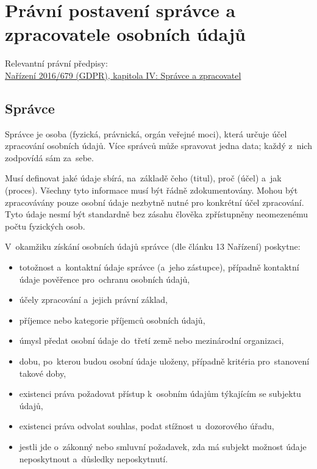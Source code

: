 \clearpage
\section{Právní postavení správce a zpracovatele osobních údajů}

{}Relevantní právní předpisy:
\\\href{https://eur-lex.europa.eu/legal-content/CS/ALL/?uri=CELEX:32016R0679#d1e3011-1-1
}{Nařízení 2016/679 (GDPR), kapitola IV: Správce a zpracovatel}

\subsection{Správce}

Správce je osoba (fyzická, právnická, orgán veřejné moci), která určuje účel zpracování osobních údajů.
Více správců může spravovat jedna data; každý z~nich zodpovídá sám za~sebe.

Musí definovat jaké údaje sbírá, na~základě čeho (titul), proč (účel) a~jak (proces).
Všechny tyto informace musí být řádně zdokumentovány.
Mohou být zpracovávány pouze osobní údaje nezbytně nutné pro konkrétní účel zpracování.
Tyto údaje nesmí být standardně bez zásahu člověka zpřístupněny neomezenému počtu fyzických osob.

V~okamžiku získání osobních údajů správce (dle článku 13 Nařízení) poskytne:

\begin{itemize}
    \item totožnost a~kontaktní údaje správce (a~jeho zástupce), případně kontaktní údaje pověřence pro~ochranu osobních údajů,
    \item účely zpracování a~jejich právní základ,
    \item příjemce nebo kategorie příjemců osobních údajů,
    \item úmysl předat osobní údaje do~třetí země nebo mezinárodní organizaci,
    \item dobu, po~kterou budou osobní údaje uloženy, případně kritéria pro~stanovení takové doby,
    \item existenci práva požadovat přístup k~osobním údajům týkajícím se subjektu údajů,
    \item existenci práva odvolat souhlas, podat stížnost u~dozorového úřadu,
    \item jestli jde o~zákonný nebo smluvní požadavek, zda má subjekt možnost údaje neposkytnout a~důsledky neposkytnutí.
\end{itemize}

